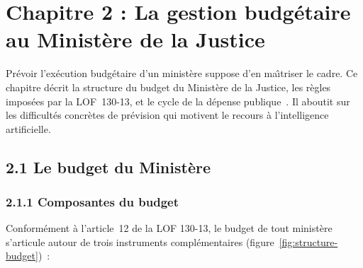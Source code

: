 ﻿
\section*{Chapitre 2 : La gestion budg\'etaire au Minist\`ere de la Justice}

\bigskip

Pr\'evoir l'ex\'ecution budg\'etaire d'un minist\`ere suppose d'en ma\^{\i}triser le cadre. Ce chapitre d\'ecrit la structure du budget du Minist\`ere de la Justice, les r\`egles impos\'ees par la LOF~130-13, et le cycle de la d\'epense publique~\citep{Bouvier2020}. Il aboutit sur les difficult\'es concr\`etes de pr\'evision qui motivent le recours \`a l'intelligence artificielle.

\subsection*{2.1 \quad Le budget du Minist\`ere}

\subsubsection*{2.1.1 \quad Composantes du budget}

Conform\'ement \`a l'article~12 de la LOF 130-13, le budget de tout minist\`ere s'articule autour de trois instruments compl\'ementaires (figure~\ref{fig:structure-budget})~:

